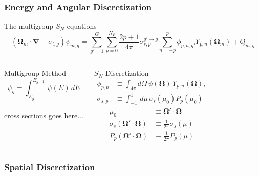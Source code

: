 \documentclass[compress,10pt]{beamer}
\renewcommand{\vec}[1]{\mathbf{#1}}
\begin{document}
\begin{frame}[t]\frametitle{Energy and Angular Discretization}
\begin{block}{The multigroup $S_N$ equations}{\small
\begin{equation*}
\left( \vec{\Omega}_m \cdot \vec{\nabla}  + \sigma_{t,g}  \right)  \psi_{m,g}= \sum_{g'=1}^{G} \sum_{p=0}^{N_P} \frac{2p + 1}{4 \pi} \sigma_{s,p}^{g' \rightarrow g}   \sum_{n=-p}^{p}  \phi_{p,n,g'}  Y_{p,n} (  \vec{\Omega}_m ) +  Q_{m,g}
\end{equation*}}
\end{block}
\centering
\begin{columns}
\begin{block}{Multigroup Method}{\small
\begin{equation*}
\psi_g =\int_{E_g}^{E_{g-1}} \, \psi ( E) \, dE
\end{equation*} \\
cross sections goes here...
}\end{block}
\begin{block}{$S_N$ Discretization}{\small
\begin{equation*}
\begin{aligned}
\phi_{p,n} &\equiv \int_{4 \pi} d\Omega \, \psi(\vec{\Omega}) \, Y_{p,n} (\vec{\Omega}), \\
\sigma_{s,p} &\equiv  \int_{-1}^{1} \, d \mu \, \sigma_s ( \mu_0) P_p (\mu_0) 
\end{aligned}
\end{equation*}
\vspace{0.3cm}
\begin{equation*}
\begin{aligned}
\mu_0 &\equiv \vec{\Omega}' \cdot \vec{\Omega} \\
\sigma_s ( \vec{\Omega}' \cdot \vec{\Omega}) &\equiv  \frac{1}{2 \pi} \sigma_s ( \mu ) \\
P_p ( \vec{\Omega}' \cdot \vec{\Omega}) &\equiv  \frac{1}{2 \pi} P_p (\mu)
\end{aligned}
\end{equation*}
}\end{block}
\end{columns}
\end{frame}
\typeout{***********************************************************************************}
\begin{frame}[t]\frametitle{Spatial Discretization}

\end{frame}
\end{document}
